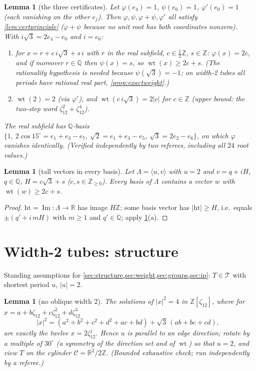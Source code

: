 \documentclass[11pt,a4paper,oneside]{article}
\theoremstyle{plain}
\newtheorem{lemma}[theorem]{Lemma}
\theoremstyle{definition}
\theoremstyle{remark}
\DeclareMathOperator{\wt}{wt}
\newcommand{\ZZ}{\mathbb{Z}}
\newcommand{\QQ}{\mathbb{Q}}
\newcommand{\RR}{\mathbb{R}}
\newcommand{\Tcl}{\mathcal{T}}
\newcommand{\zt}[1]{\zeta_{#1}}
\begin{document}
\begin{lemma}[the three certificates]\label{lem:certs}
Let $\varphi(e_4) = 1$, $\psi(e_6) = 1$, $\varphi'(e_0) = 1$ (each vanishing on the other
$e_j$). Then $\varphi, \psi, \varphi + \psi, \varphi'$ all satisfy \cref{lem:certprinciple}
($\varphi + \psi$ because no unit root has both coordinates nonzero). With
$i\sqrt3 = 2e_4 - e_0$ and $i = e_6$:
\begin{enumerate}[label=(\alph*),nosep]
\item for $x = r + c\, i\sqrt3 + s\, i$ with $r$ in the real subfield, $c \in \tfrac12\ZZ$,
$s \in \ZZ$: $\varphi(x) = 2c$, and if moreover $r \in \QQ$ then $\psi(x) = s$, so
$\wt(x) \ge 2c + s$. (The rationality hypothesis is needed because $\psi(\sqrt3) = -1$; on
width-2 tubes all periods have rational real part, \cref{prop:exactweight}.)
\item $\wt(2) = 2$ (via $\varphi'$), and $\wt(c\, i\sqrt3) = 2|c|$ for $c \in \ZZ$ (upper
bound: the two-step word $\zt{12}^2 + \zt{12}^4$).
\end{enumerate}
The real subfield has $\QQ$-basis $\{1,\ 2\cos15^\circ = e_1{+}e_3{-}e_7,\ \sqrt2 =
e_1{+}e_3{-}e_5,\ \sqrt3 = 2e_2{-}e_6\}$, on which $\varphi$ vanishes identically.
(Verified independently by two referees, including all $24$ root values.)
\end{lemma}

\begin{lemma}[tall vectors in every basis]\label{lem:tallvec}
Let $\Lambda = \langle u, v\rangle$ with $u = 2$ and $v = q + iH$, $q \in \QQ$,
$H = c\sqrt3 + s$ ($c, s \in \ZZ_{\ge0}$). Every basis of $\Lambda$ contains a vector $w$
with $\wt(w) \ge 2c + s$.
\end{lemma}
\begin{proof}
$\mathrm{ht} = \operatorname{Im}\colon \Lambda \to \RR$ has image $H\ZZ$; some basis vector
has $|\mathrm{ht}| \ge H$, i.e.\ equals $\pm(q' + i\, mH)$ with $m \ge 1$ and $q' \in \QQ$;
apply \cref{lem:certs}(a).
\end{proof}

\section{Width-2 tubes: structure}\label{sec:structure}

Standing assumptions for \cref{sec:structure,sec:weight,sec:groups,sec:ip}: $T \in \Tcl$
with shortest period $u$, $|u| = 2$.

\begin{lemma}[no oblique width 2]\label{lem:nooblique}
The solutions of $|x|^2 = 4$ in $\ZZ[\zt{12}]$, where for $x = a + b\zt{12} + c\zt{12}^2 +
d\zt{12}^3$
\[
|x|^2 = (a^2{+}b^2{+}c^2{+}d^2{+}ac{+}bd) + \sqrt3\,(ab{+}bc{+}cd),
\]
are exactly the twelve $x = 2\zt{12}^j$. Hence $u$ is parallel to an edge direction; rotate
by a multiple of $30^\circ$ (a symmetry of the direction set and of $\wt$) so that $u = 2$,
and view $T$ on the cylinder $\mathcal{C} = \RR^2/2\ZZ$. (Bounded exhaustive check; run
independently by a referee.)
\end{lemma}
\end{document}
